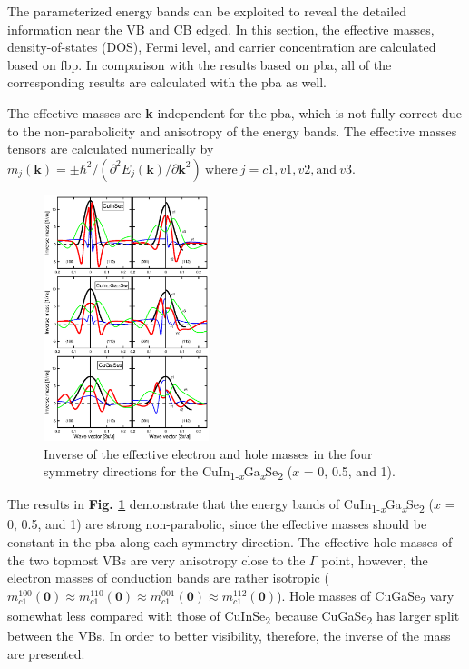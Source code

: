 \documentclass[a4paper, 12pt, titlepage,oneside,drop]{kthesis}
\begin{document}
The parameterized energy bands can be exploited to reveal the detailed information near the VB and CB edged. In this section, the effective masses, density-of-states (DOS), Fermi level, and carrier concentration are calculated based on
fbp. In comparison with the results based on pba, all of the corresponding results are calculated with the pba as well.  

The effective masses are \textbf{k}-independent for the pba, which is not fully correct due to the non-parabolicity and anisotropy of the energy bands.  The effective masses tensors are calculated numerically by 
$m_j(\textbf{k}) = \pm \hbar^2/(\partial^2 E_j(\textbf{k})/\partial\textbf{k}^2) \ \textrm{where}\  j = c1, v1, v2, \textrm{and}\  v3.$


\begin{figure}[H]
    \begin{center}
            \includegraphics[width=0.43\textwidth,clip]{paper1figure3}
     \end{center}
    \caption{ Inverse of the effective electron and hole masses in the four symmetry directions for the {CuIn\textsubscript{1-\textit{x}}Ga\textsubscript{\textit{x}}Se\textsubscript{2}} ($x$ = 0, 0.5, and 1).}      
    \label{inversemessf}
\end{figure}

The results in \textbf{Fig. \ref{inversemessf}} demonstrate that the energy bands of {CuIn\textsubscript{1-\textit{x}}Ga\textsubscript{\textit{x}}Se\textsubscript{2}} ($x$ = 0, 0.5, and 1) are strong non-parabolic, since the effective masses should be constant in the pba along each symmetry direction. The effective hole masses of the two 
topmost VBs are very anisotropy close to the $\Gamma$ point, however, the electron masses of conduction bands are rather isotropic ($m_{c1}^{100}(\textbf{0}) \approx m_{c1}^{110}(\textbf{0}) \approx m_{c1}^{001}(\textbf{0}) 
\approx m_{c1}^{112}(\textbf{0})$). Hole masses of CuGaSe\textsubscript{2} vary somewhat less compared with those of CuInSe\textsubscript{2} because CuGaSe\textsubscript{2} has larger split between the VBs. In order to better 
visibility, therefore, the inverse of the mass are presented.
\end{document}
